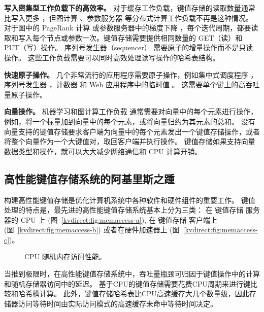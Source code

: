 \textbf {写入密集型工作负载下的高效率。}
对于缓存工作负载，键值存储的读取数量通常比写入更多 \cite {atikoglu2012workload}，但图计算 \cite {page1999pagerank}、参数服务器\cite {li2014scaling} 等分布式计算工作负载不再是这种情况。
对于图中的 PageRank 计算 \cite {page1999pagerank} 或参数服务器中的梯度下降 \cite {li2014scaling}，每个迭代周期，都要读取和写入每个节点或参数一次。键值存储需要提供相同数量的 GET（读）和 PUT（写）操作。
序列号发生器（sequencer）\cite {kalia2016design} 需要原子的增量操作而不是只读操作。
这些工作负载需要可以同时高效处理读写操作的哈希表结构。

\textbf {快速原子操作。}
几个非常流行的应用程序需要原子操作，例如集中式调度程序 \cite {perry2014fastpass}，序列号发生器 \cite {kalia2016design,eris}，计数器 \cite {zhu2015packet} 和 Web 应用程序中的临时值 \cite {atikoglu2012workload}。
这需要单个键上的高吞吐量原子操作。

\textbf {向量操作。}
机器学习和图计算工作负载 \cite {li2014scaling,shao2013trinity,xiao17tux2} 通常需要对向量中的每个元素进行操作，例如，将一个标量加到向量中的每个元素，或将向量归约为其元素的总和。
没有向量支持的键值存储要求客户端为向量中的每个元素发出一个键值存储操作，或者将整个向量作为一个大键值对，取回客户端并执行操作。
键值存储如果支持向量数据类型和操作，就可以大大减少网络通信和 CPU 计算开销。

\subsection{高性能键值存储系统的阿基里斯之踵}
\label{kvdirect:sec:state-of-the-art-kvs}

构建高性能键值存储是优化计算机系统中各种软件和硬件组件的重要工作。
键值处理的特点是，最先进的高性能键值存储系统基本上分为三类：
在 键值存储 服务器的 CPU 上
(图~\ref{kvdirect:fig:memaccess-a}),
在 键值存储 客户端上
(图~\ref{kvdirect:fig:memaccess-b})
或者在硬件加速器上
(图~\ref{kvdirect:fig:memaccess-c})。


\begin{figure}[t]
	\centering
	\caption{CPU 随机内存访问性能。}
	\label{kvdirect:fig:cpu-mem}
\end{figure}

当推到极限时，在高性能键值存储系统中，吞吐量瓶颈可归因于键值操作中的计算和随机存储器访问中的延迟。
基于CPU的键值存储需要花费CPU周期来进行键比较和哈希槽计算。
此外，键值存储哈希表比CPU高速缓存大几个数量级，因此存储器访问等待时间由实际访问模式的高速缓存未命中等待时间决定。


